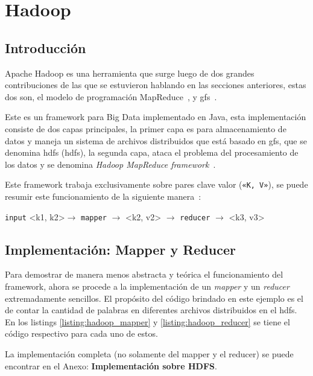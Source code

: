 \section{Hadoop}
\label{sec:hadoop}

\subsection*{Introducción}
Apache Hadoop es una herramienta que surge luego de dos grandes contribuciones
de las que se estuvieron hablando en las secciones anteriores, estas dos son,
el modelo de programación MapReduce~\cite{dean2004, dean2008}, y
\acrshort{gfs}~\cite{ghemawat2003}.

Este es un \gls{framework} para Big Data implementado en Java, esta
implementación consiste de dos capas principales, la primer capa es para
almacenamiento de datos y 
maneja un sistema de archivos distribuidos que está basado en \acrshort{gfs}, 
que se denomina \acrlong{hdfs} (\acrshort{hdfs}), la segunda capa, ataca el
problema del procesamiento de los datos y se denomina {\it Hadoop MapReduce
\Gls{framework}}~\cite{lee2012}.

Este \gls{framework} trabaja exclusivamente sobre pares clave valor ({\tt «K,
V»}), se puede resumir este funcionamiento de la siguiente manera~\cite{}:

\begin{tcolorbox}
  \centering
  {\tt input} <k1, k2>$\rightarrow$ {\tt mapper} $\rightarrow$ <k2, v2> $\rightarrow$
  {\tt reducer} $\rightarrow$ <k3, v3>
\end{tcolorbox}

\subsection*{Implementación: Mapper y Reducer}

Para demostrar de manera menos abstracta y teórica el funcionamiento del
framework, ahora se procede a la implementación de un {\it mapper} y un {\it
reducer} extremadamente sencillos. El propósito del código brindado en este 
ejemplo es el de contar
la cantidad de palabras en diferentes archivos distribuidos en el
\acrshort{hdfs}. En los listings \ref{listing:hadoop_mapper} y
\ref{listing:hadoop_reducer} se tiene el código respectivo para cada uno de estos. 

La implementación completa (no solamente del mapper y el reducer) se puede encontrar
en el Anexo: {\bf Implementación sobre HDFS}.







